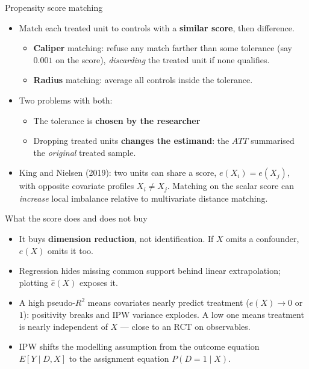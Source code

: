 \documentclass[
  11pt,
  ignorenonframetext,
  aspectratio=169,
]{beamer}
\newcounter{none} %
\providecommand{\tightlist}{%
  \setlength{\itemsep}{0pt}\setlength{\parskip}{0pt}}
\begin{document}
\begin{frame}{Propensity score matching}
\protect{}\label{propensity-score-matching}
\begin{itemize}
\tightlist
\item
  Match each treated unit to controls with a \textbf{similar score},
  then difference.

  \begin{itemize}
  \tightlist
  \item
    \textbf{Caliper} matching: refuse any match farther than some
    tolerance (say \(0.001\) on the score), \emph{discarding} the
    treated unit if none qualifies.
  \item
    \textbf{Radius} matching: average all controls inside the tolerance.
  \end{itemize}
\item
  Two problems with both:

  \begin{itemize}
  \tightlist
  \item
    The tolerance is \textbf{chosen by the researcher}
  \item
    Dropping treated units \textbf{changes the estimand}: the \(ATT\)
    summarised the \emph{original} treated sample.
  \end{itemize}
\item
  King and Nielsen (2019): two units can share a score,
  \(e(X_i) = e(X_j)\), with opposite covariate profiles
  \(X_i \neq X_j\). Matching on the scalar score can \emph{increase}
  local imbalance relative to multivariate distance matching.
\end{itemize}
\end{frame}

\begin{frame}{What the score does and does not buy}
\protect{}\label{what-the-score-does-and-does-not-buy}
\begin{itemize}
\tightlist
\item
  It buys \textbf{dimension reduction}, not identification. If \(X\)
  omits a confounder, \(e(X)\) omits it too.
\item
  Regression hides missing common support behind linear extrapolation;
  plotting \(\hat e(X)\) exposes it.
\item
  A high pseudo-\(R^2\) means covariates nearly predict treatment
  (\(e(X) \to 0\) or \(1\)): positivity breaks and IPW variance
  explodes. A low one means treatment is nearly independent of \(X\) ---
  close to an RCT on observables.
\item
  IPW shifts the modelling assumption from the outcome equation
  \(E[Y \mid D, X]\) to the assignment equation \(P(D{=}1 \mid X)\).
\end{itemize}
\end{frame}
\end{document}
